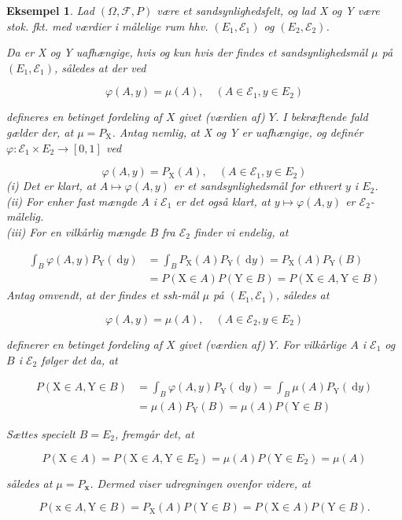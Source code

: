 \documentclass{article}
\newcommand{\1}{\mathbbm{1}}
\theoremstyle{boxed}
\newtheorem{example}[theorem]{Eksempel}
\begin{document}
\begin{example}
Lad $(\Omega, \mathcal{F}, P)$ være et sandsynlighedsfelt, og lad X og Y være stok. fkt. med værdier i målelige rum hhv. $\left(E_1, \mathcal{E}_1\right)$ og $\left(E_2, \mathcal{E}_2\right)$.

Da er X og Y uafhængige, hvis og kun hvis der findes et sandsynlighedsmål $\mu$ på $\left(E_1, \mathcal{E}_1\right)$, således at der ved

$$
\varphi(A, y)=\mu(A), \quad\left(A \in \mathcal{E}_1, y \in E_2\right)
$$

defineres en betinget fordeling af $X$ givet (værdien af) $Y$.
I bekræftende fald gælder der, at $\mu=P_{\mathrm{X}}$.
Antag nemlig, at X og Y er uafhængige, og definér $\varphi: \mathcal{E}_1 \times E_2 \rightarrow[0,1]$ ved

$$
\varphi(A, y)=P_{\mathrm{X}}(A), \quad\left(A \in \mathcal{E}_1, y \in E_2\right)
$$
(i) Det er klart, at $A \mapsto \varphi(A, y)$ er et sandsynlighedsmål for ethvert $y$ i $E_2$.
\\(ii) For enher fast mængde $A$ i $\mathcal{E}_1$ er det også klart, at $y \mapsto \varphi(A, y)$ er $\mathcal{E}_2$-målelig.
\\(iii) For en vilkårlig mængde $B$ fra $\mathcal{E}_2$ finder vi endelig, at

$$
\begin{aligned}
\int_B \varphi(A, y) P_{\mathrm{Y}}(\mathrm{~d} y) & =\int_B P_{\mathrm{X}}(A) P_{\mathrm{Y}}(\mathrm{~d} y)=P_{\mathrm{X}}(A) P_{\mathrm{Y}}(B) \\
& =P(\mathrm{X} \in A) P(\mathrm{Y} \in B)=P(\mathrm{X} \in A, \mathrm{Y} \in B)
\end{aligned}
$$
Antag omvendt, at der findes et ssh-mål $\mu$ på $\left(E_1, \mathcal{E}_1\right)$, således at

$$
\varphi(A, y)=\mu(A), \quad\left(A \in \mathcal{E}_2, y \in E_2\right)
$$

definerer en betinget fordeling af $X$ givet (værdien af) $Y$.
For vilkårlige $A$ i $\mathcal{E}_1$ og $B$ i $\mathcal{E}_2$ følger det da, at

$$
\begin{aligned}
P(\mathrm{X} \in A, \mathrm{Y} \in B) & =\int_B \varphi(A, y) P_{\mathrm{Y}}(\mathrm{~d} y)=\int_B \mu(A) P_{\mathrm{Y}}(\mathrm{~d} y) \\
& =\mu(A) P_{\mathrm{Y}}(B)=\mu(A) P(\mathrm{Y} \in B)
\end{aligned}
$$


Sættes specielt $B=E_2$, fremgår det, at

$$
P(\mathrm{X} \in A)=P\left(\mathrm{X} \in A, \mathrm{Y} \in E_2\right)=\mu(A) P\left(\mathrm{Y} \in E_2\right)=\mu(A)
$$

således at $\mu=P_{\mathbf{x}}$.
Dermed viser udregningen ovenfor videre, at

$$
P(\mathrm{x} \in A, \mathrm{Y} \in B)=P_{\mathrm{X}}(A) P(\mathrm{Y} \in B)=P(\mathrm{X} \in A) P(\mathrm{Y} \in B) .
$$

\end{example}
\end{document}
